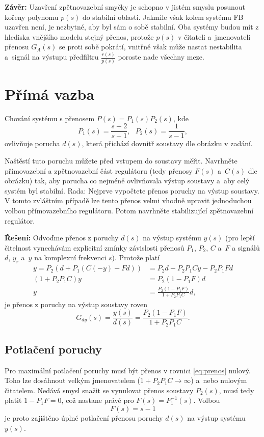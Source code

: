 \documentclass[twoside]{article}
\begin{document}
\textbf{Závěr:} Uzavření zpětnovazební smyčky je schopno v jistém smyslu posunout kořeny polynomu $p(s)$
do stabilní oblasti. Jakmile však kolem systému FB uzavřen není, je nezbytné, aby byl sám o sobě stabilní.
Oba systémy budou mít z hlediska vnějšího modelu stejný přenos, protože $p(s)$ v čitateli a~jmenovateli přenosu $G_A(s)$
se proti sobě pokrátí, vnitřně však může nastat nestabilita a~signál na výstupu předfiltru $\frac{r(s)}{p(s)}$ poroste nade všechny meze.

\section{Přímá vazba}
Chování systému s přenosem $P(s) = P_1(s) P_2(s)$, kde
\begin{equation}
	P_1(s) = \frac{s+2}{s+1}, ~~~ P_2(s) = \frac{1}{s-1},
\end{equation}
ovlivňuje porucha $d(s)$, která přichází dovnitř soustavy dle obrázku v zadání.

Naštěstí tuto poruchu můžete před vstupem do soustavy měřit. Navrhněte přímovazební a
zpětnovazební část regulátoru (tedy přenosy $F(s)$ a~$C(s)$ dle obrázku) tak, aby porucha co nejméně
ovlivňovala výstup soustavy a~aby celý systém byl stabilní.
Rada: Nejprve vypočtete přenos poruchy na výstup soustavy. V tomto zvláštním případě lze tento přenos
velmi vhodně upravit jednoduchou volbou přímovazebního regulátoru. Potom navrhněte stabilizující
zpětnovazební regulátor. 

\textbf{Řešení:}
Odvoďme přenos z poruchy $d(s)$ na výstup systému $y(s)$ (pro lepší čitelnost vynechávám explicitní zmínky závislosti
přenosů $P_1$, $P_2$, $C$ a~$F$ a signálů $d$, $y_r$ a~$y$ na komplexní frekvenci $s$). Protože platí
\begin{equation}
	\begin{split}
		y = P_2 (d + P_1(C (-y) - F d)) &= P_2 d - P_2 P_1 C y - P_2 P_1 F d\\
		(1 + P_2 P_1 C)y &= P_2(1-P_1 F) d \\
		y &= \frac{P_2(1-P_1 F)}{1 + P_2 P_1 C} d,
	\end{split}
\end{equation}
je přenos z poruchy na výstup soustavy roven
\begin{equation}
	G_{dy}(s) = \frac{y(s)}{d(s)} = \frac{P_2(1-P_1 F)}{1 + P_2 P_1 C}.
	\label{eq:prenos}
\end{equation}

\subsection{Potlačení poruchy}
Pro maximální potlačení poruchy musí být přenos v rovnici \eqref{eq:prenos} nulový. Toho lze dosáhnout velkým jmenovatelem
($1 + P_2 P_1 C \rightarrow \infty$) a~nebo nulovým čitatelem. Nedává smysl snažit se vynulovat přenos soustavy $P_2(s)$,
musí tedy platit $ 1 - P_1 F = 0$, což nastane právě pro $F(s) = P_1^{-1} (s)$. Volbou
\begin{equation}
	F(s) = s - 1
\end{equation}
je proto zajištěno úplné potlačení přenosu poruchy $d(s)$ na výstup systému $y(s)$.
\end{document}
